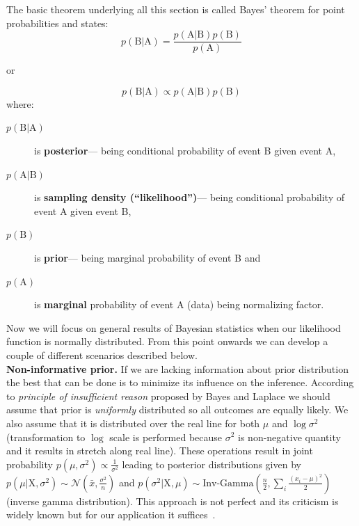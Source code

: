 \documentclass[12pt, a4paper, pdflatex, leqno]{report}
\begin{document}
The basic theorem underlying all this section is called Bayes' theorem for point probabilities and states:
$$
p \left( \mathrm{B} | \mathrm{A} \right) = \frac{  p \left( \mathrm{A} | \mathrm{B} \right) p \left( \mathrm{B} \right) }{ p \left( \mathrm{A} \right) }
$$
\begin{center}
or
\end{center}
$$
p \left( \mathrm{B} | \mathrm{A} \right) \propto p \left( \mathrm{A} | \mathrm{B} \right) p \left( \mathrm{B} \right)
$$
where:
\begin{description}
\item[$p \left( \mathrm{B} | \mathrm{A} \right)$] is \textbf{posterior}--- being conditional probability of event \textrm{B} given event \textrm{A},
\item[$p \left( \mathrm{A} | \mathrm{B} \right)$] is \textbf{sampling density (``likelihood'')}--- being conditional probability of event \textrm{A} given event \textrm{B},
\item[$p \left( \mathrm{B} \right)$] is \textbf{prior}--- being marginal probability of event \textrm{B} and
\item[$p \left( \mathrm{A} \right)$] is \textbf{marginal} probability of event \textrm{A} (data) being normalizing factor.
\end{description}

Now we will focus on general results of Bayesian statistics when our likelihood function is normally distributed. From this point onwards we can develop a couple of different scenarios described below.\\

\textbf{\textrm{Non-informative prior. }}If we are lacking information about prior distribution the best that can be done is to minimize its influence on the inference. According to \emph{principle of insufficient reason} proposed by Bayes and Laplace we should assume that prior is \emph{uniformly} distributed so all outcomes are equally likely. We also assume that it is distributed over the real line for both $\mu$ and $\log \sigma^2$ (transformation to $\log$ scale is performed because $\sigma^2$ is non-negative quantity and it results in stretch along real line). These operations result in joint probability $p \left( \mu, \sigma^2 \right) \propto \frac{1}{\sigma^2} $ leading to posterior distributions given by $p \left( \mu | \mathrm{X}, \sigma^2 \right) \sim \mathcal{N} \left( \bar{x}, \frac{\sigma^2}{n} \right) $ and $p \left( \sigma^2 | \mathrm{X}, \mu \right) \sim \mathrm{Inv}\text{-}\mathrm{Gamma} \left( \frac{n}{2} , \sum_{i} \frac{\left( x_i - \mu \right)^2}{2}  \right) $ (inverse gamma distribution). This approach is not perfect and its criticism is widely known but for our application it suffices~\citep{Syversveen98noninformativebayesian}.\\
\end{document}
